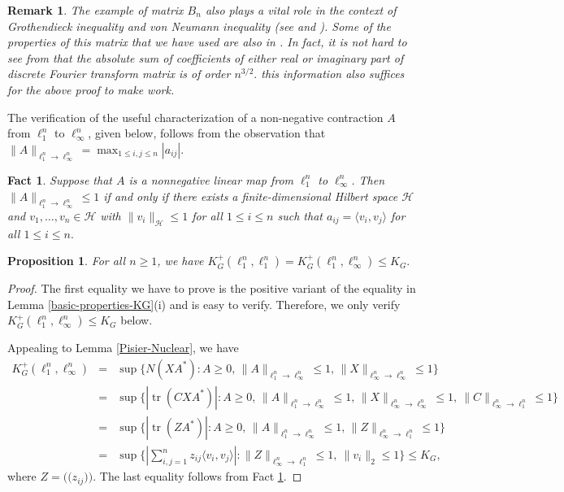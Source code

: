 \documentclass[a4paper,oneside,11pt, reqno]{amsart}
\numberwithin{equation}{section}
\newtheorem{proposition}[theorem]{Proposition}
\newtheorem{fact}[theorem]{Fact}
\newtheorem{remark}[theorem]{Remark}
\theoremstyle{plain}
\begin{document}
\begin{remark}
The example of matrix $B_n$ also plays a vital role in the context of Grothendieck inequality and von Neumann inequality (see \cite{Blei} and \cite{Ton78}). Some of the properties of this matrix that we have used are also in \cite{Ton78}. In fact, it is not hard to see from \cite{Ton78} that the absolute sum of coefficients of either real or imaginary part of discrete Fourier transform matrix is of order $n^{3/2}.$ this information also suffices for the above proof to make work.
\end{remark}
The verification of the useful characterization of a non-negative contraction $A$ from $\ell_1^n$ to $\ell_\infty^n$, given below, follows from the observation that $\|A\|_{\ell_1^n\to\ell_\infty^n}=\max_{1\leqslant i,j\leqslant n}|a_{ij}|$. 
\begin{fact}\label{fact6.7}   Suppose that $A$ is a nonnegative linear map from $\ell_1^n$ to $\ell_\infty^n$. Then $\|A\|_{\ell_1^n\to\ell_\infty^n}\leqslant 1$ if and only if  there exists a finite-dimensional Hilbert space $\mathcal H$ and $v_1,\dots,v_n\in\mathcal H$ with $\|v_i\|_{\mathcal H}\leqslant 1$ for all $1\leqslant i\leqslant n$ such that $a_{ij}=\langle v_i,v_j\rangle$ for all $1\leqslant i\leqslant n.$
\end{fact}

\begin{proposition}\label{positive-1-infinity}
For all $n\geqslant 1$, we have $K_G^{+}(\ell_1^n,\ell_1^n)=K_G^{+}(\ell_1^n,\ell_\infty^n)\leqslant K_G.$
\end{proposition}
\begin{proof}
The first equality we have to prove is the positive variant of the equality in Lemma \ref{basic-properties-KG}(i) and is easy to verify.  Therefore, we only verify $K_G^{+} (\ell_1^n,\ell_\infty^n)\leqslant K_G$ below.

Appealing to Lemma \ref{Pisier-Nuclear}, we have
\begin{eqnarray*}%
K_G^+(\ell_1^n,\ell_\infty^n) &=& \sup \{N(XA^*): A\geqslant 0,\, \|A\|_{\ell_1^n\to \ell_\infty^n}\leqslant 1,\, \|X\|_{\ell_\infty^n \to\ell_\infty^n}\leqslant 1\}\\\nonumber
&= &\sup\{|\operatorname{tr}(CXA^*)|: A\geqslant 0,\, \|A\|_{\ell_1^n\to \ell_\infty^n}\leqslant 1,\, \|X\|_{\ell_\infty^n \to\ell_\infty^n}\leqslant 1,\ \|C\|_{\ell_\infty^n\to\ell_1^n}\leqslant 1\}\\\nonumber
&=  &\sup\{|\operatorname{tr}(ZA^*)|:A\geqslant 0,\, \|A\|_{\ell_1^n\to \ell_\infty^n}\leqslant 1,\, \|Z\|_{\ell_\infty^n \to\ell_1^n}\leqslant 1\}\\\nonumber
&=&\sup\{|\sum_{i,j=1}^nz_{ij}\langle v_i,v_j\rangle|:\|Z\|_{\ell_\infty^n \to\ell_1^n}\leqslant 1,\ \|v_i\|_2\leqslant 1\}\leqslant K_G, 
\end{eqnarray*}
where $Z= \big (\!\!\big ( z_{ij}\big )\!\!\big )$. The last equality follows from Fact \ref{fact6.7}.
\end{proof}
\end{document}
